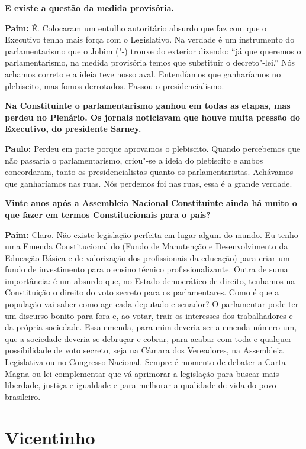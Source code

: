 \textbf{E existe a questão da medida provisória.}

\textbf{Paim:} É. Colocaram um entulho autoritário absurdo que faz com
que o Executivo tenha mais força com o Legislativo. Na verdade é um
instrumento do parlamentarismo que o Jobim ("-) trouxe do exterior
dizendo: ``já que queremos o parlamentarismo, na medida provisória temos
que substituir o decreto"-lei.'' Nós achamos correto e a ideia teve nosso
aval. Entendíamos que ganharíamos no plebiscito, mas fomos derrotados.
Passou o presidencialismo.

\textbf{Na Constituinte o parlamentarismo ganhou em todas as etapas, mas
perdeu no Plenário. Os jornais noticiavam que houve muita pressão do
Executivo, do presidente Sarney.}

\textbf{Paulo:} Perdeu em parte porque aprovamos o plebiscito. Quando
percebemos que não passaria o parlamentarismo, criou"-se a ideia do
plebiscito e ambos concordaram, tanto os presidencialistas quanto os
parlamentaristas. Achávamos que ganharíamos nas ruas. Nós perdemos foi
nas ruas, essa é a grande verdade.

\textbf{Vinte anos após a Assembleia Nacional Constituinte ainda há
muito o que fazer em termos Constitucionais para o país?}

\textbf{Paim:} Claro. Não existe legislação perfeita em lugar algum do
mundo. Eu tenho uma Emenda Constitucional do  (Fundo de Manutenção
e Desenvolvimento da Educação Básica e de valorização dos profissionais
da educação) para criar um fundo de investimento para o ensino técnico
profissionalizante. Outra de suma importância: é um absurdo que, no
Estado democrático de direito, tenhamos na Constituição o direito do
voto secreto para os parlamentares. Como é que a população vai saber
como age cada deputado e senador? O parlamentar pode ter um discurso
bonito para fora e, ao votar, trair os interesses dos trabalhadores e da
própria sociedade. Essa emenda, para mim deveria ser a emenda número um,
que a sociedade deveria se debruçar e cobrar, para acabar com toda e
qualquer possibilidade de voto secreto, seja na Câmara dos Vereadores,
na Assembleia Legislativa ou no Congresso Nacional. Sempre é momento de
debater a Carta Magna ou lei complementar que vá aprimorar a legislação
para buscar mais liberdade, justiça e igualdade e para melhorar a
qualidade de vida do povo brasileiro.

\chapter{Vicentinho}

